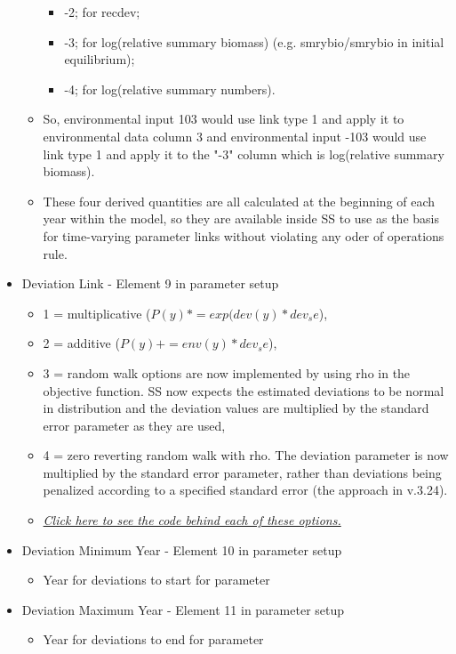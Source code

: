 \begin{itemize}
\begin{itemize}
\begin{itemize}
				\item -2;  for recdev;
				\item -3;  for log(relative summary biomass) (e.g. smrybio/smrybio in initial equilibrium);
				\item -4;  for log(relative summary numbers).
			\end{itemize}
			\item So, environmental input 103 would use link type 1 and apply it to environmental data column 3 and environmental input -103  would use link type 1 and apply it to the "-3" column which is log(relative summary biomass).
			\item These four derived quantities are all calculated at the beginning of each year within the model, so they are available inside SS to use as the basis for time-varying parameter links without violating any oder of operations rule. 
		\end{itemize}
		
	\item Deviation Link - Element 9 in parameter setup
	\begin{itemize}
		\item 1 = multiplicative ($P(y)*=exp(dev(y)*dev_se$),
		\item 2 = additive ($P(y)+=env(y)*dev_se$),
		\item 3 = random walk options are now implemented by using rho in the objective function. SS now expects the estimated deviations to be normal in distribution and the deviation values are multiplied by the standard error parameter as they are used,
		\item 4 = zero reverting random walk with rho. The deviation parameter is now multiplied by the standard error parameter, rather than deviations being penalized according to a specified standard error (the approach in v.3.24).
		\item \hyperlink{DevLink}{\textit{Click here to see the code behind each of these options.}}
	\end{itemize}
	
	\item Deviation  Minimum Year - Element 10 in parameter setup
		\begin{itemize}
			\item Year for deviations to start for parameter
		\end{itemize}
		
	\item Deviation  Maximum Year - Element 11 in parameter setup
		\begin{itemize}
			\item Year for deviations to end for parameter
		\end{itemize}
		

\end{itemize}
